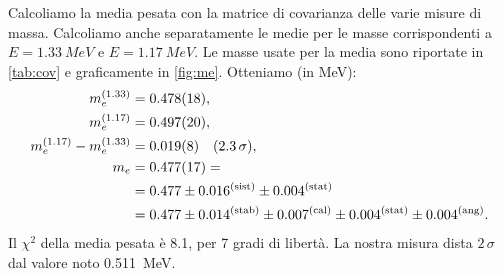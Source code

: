 Calcoliamo la media pesata con la matrice di covarianza delle varie misure di massa.
Calcoliamo anche separatamente le medie per le masse corrispondenti a $E=\SI{1.33}{MeV}$ e $E=\SI{1.17}{MeV}$.
Le masse usate per la media sono riportate in \autoref{tab:cov} e graficamente in \autoref{fig:me}.
Otteniamo (in \si{MeV}):
\begin{align*}
	m_e^{(1.33)}                &= \num{0.478 \pm 0.018}  ,    \\
	m_e^{(1.17)}                &= \num{0.497 \pm 0.020}  ,    \\
	m_e^{(1.17)} - m_e^{(1.33)} &= \num{0.019 \pm 0.008}  \quad(2.3\,\sigma),   \\
	m_e                         &= \num{0.477 \pm 0.017} = \\
	                            &=      0.477 \pm 0.016^{(\text{sist})} \pm 0.004^{(\text{stat})} \\
										 &=      0.477 \pm 0.014^{(\text{stab})} \pm 0.007^{(\text{cal})} \pm 0.004^{(\text{stat})} \pm 0.004^{(\text{ang})}.
\end{align*}
Il $\chi^2$ della media pesata è 8.1, per 7 gradi di libertà.
La nostra misura dista $2\,\sigma$ dal valore noto \SI{0.511}{MeV}.

